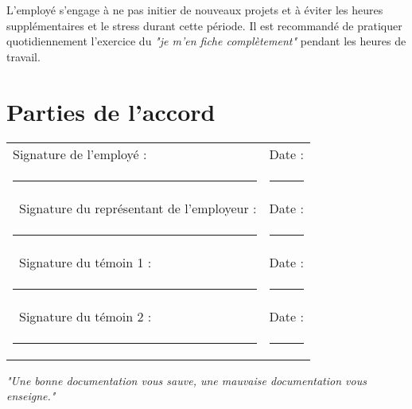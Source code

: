 \documentclass[a4paper,11pt]{article}
\begin{document}
L'employé s'engage à ne pas initier de nouveaux projets et à éviter les heures supplémentaires et le stress durant cette période. Il est recommandé de pratiquer quotidiennement l'exercice du \textit{"je m'en fiche complètement"} pendant les heures de travail.

\section*{Parties de l'accord}

\vspace{2em}
\noindent\begin{tabular}{@{}p{8cm}p{8cm}@{}}
Signature de l'employé : & Date : \\
\rule{8cm}{0.4pt} & \rule{8cm}{0.4pt} \\\
Signature du représentant de l'employeur : & Date : \\
\rule{8cm}{0.4pt} & \rule{8cm}{0.4pt} \\\
Signature du témoin 1 : & Date : \\
\rule{8cm}{0.4pt} & \rule{8cm}{0.4pt} \\\
Signature du témoin 2 : & Date : \\
\rule{8cm}{0.4pt} & \rule{8cm}{0.4pt}
\end{tabular}

\vfill

\begin{center}
    \textit{"Une bonne documentation vous sauve, une mauvaise documentation vous enseigne."}
\end{center}
\end{document}
